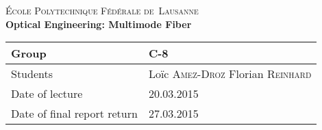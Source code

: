 \begin{titlepage}
\begin{center}
    \textsc{\LARGE École Polytechnique Fédérale de~Lausanne}\\[1.5cm] 
    {\huge \bfseries Optical Engineering: Multimode Fiber}\\[0.4cm] 
    \begin{tabular}{|p{5cm}|p{4cm}|}
        \hline
        Group & C-8 \\ \hline
        Students & Loïc \textsc{Amez-Droz} \newline Florian \textsc{Reinhard} \\ \hline
        Date of lecture & 20.03.2015 \\ \hline
        Date of final report return & 27.03.2015 \\ \hline
    \end{tabular}
\end{center}


\begin{abstract}
    \lipsum[3]
\end{abstract}
 
\vfill
\end{titlepage}
